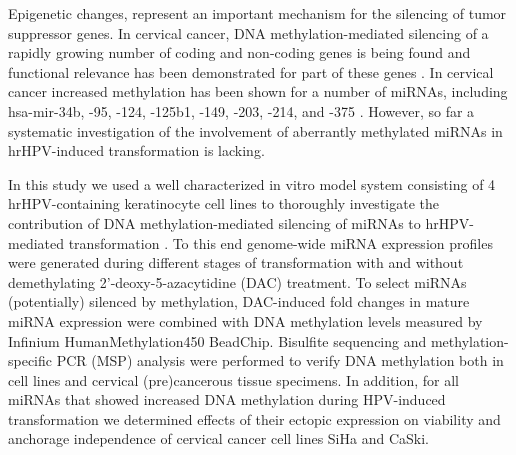 Epigenetic changes, represent an important mechanism for the silencing of tumor suppressor genes. In cervical cancer, DNA methylation-mediated silencing of a rapidly growing number of coding and non-coding genes is being found and functional relevance has been demonstrated for part of these genes \cite{Steenbergen2014, Szalmas2009, Wentzensen2009}. In cervical cancer increased methylation has been shown for a number of miRNAs, including hsa-mir-34b, -95, -124, -125b1, -149, -203, -214, and -375 \cite{Wilting2013, Botezatu2011, Soto2012, Wang2013, Wilting2010, Yao2013, Zhu2013}. However, so far a systematic investigation of the involvement of aberrantly methylated miRNAs in hrHPV-induced transformation is lacking. 

In this study we used a well characterized in vitro model system consisting of 4 hrHPV-containing keratinocyte cell lines to thoroughly investigate the contribution of DNA methylation-mediated silencing of miRNAs to hrHPV-mediated transformation \cite{Steenbergen1996}. To this end genome-wide miRNA expression profiles were generated during different stages of transformation with and without demethylating 2'-deoxy-5-azacytidine (DAC) treatment. To select miRNAs (potentially) silenced by methylation, DAC-induced fold changes in mature miRNA expression were combined with DNA methylation levels measured by Infinium HumanMethylation450 BeadChip. Bisulfite sequencing and methylation-specific PCR (MSP) analysis were performed to verify DNA methylation both in cell lines and cervical (pre)cancerous tissue specimens. In addition, for all miRNAs that showed increased DNA methylation during HPV-induced transformation we determined effects of their ectopic expression on viability and anchorage independence of cervical cancer cell lines SiHa and CaSki.
